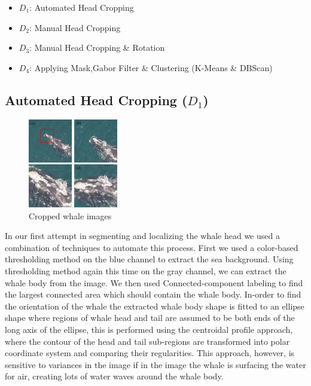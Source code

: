 \begin{itemize}
	\vspace{-0.6cm}
	\setlength{\itemsep}{0pt}
	\setlength{\parskip}{0pt}
	\setlength{\parsep}{0pt}
	
	\item{$D_{1}$: Automated Head Cropping}
	\item{$D_{2}$: Manual Head Cropping}
	\item{$D_{3}$: Manual Head Cropping \& Rotation}
	\item{$D_{4}$: Applying Mask,Gabor Filter \& Clustering (K-Means \& DBScan)}	
\end{itemize}

\subsection{Automated Head Cropping ($D_{1}$)}
\label{subsec:auto_head_cropping}
\begin{figure}
	\vspace{-0.4cm}
	\centering
	\includegraphics[width=0.35\textwidth]{sections/imgs/preprocessing/whale_image.jpg}
	\caption{Cropped whale images}
	\label{fig:preprocess_whaleimage}
\end{figure}
In our first attempt in segmenting and localizing the whale head we used a combination of techniques to automate this process. First we used a color-based thresholding method\cite{otsu1975threshold} on the blue channel to extract the sea background. Using thresholding method again this time on the gray channel, we can extract the whale body from the image. We then used Connected-component labeling\cite{haralock1991computer} to find the largest connected area which should contain the whale body. In-order to find the orientation of the whale the extracted whale body shape is fitted to an ellipse shape where regions of whale head and tail are assumed to be both ends of the long axis of the ellipse, this is performed using the centroidal profile approach\cite{davies2004machine}, where the contour of the head and tail sub-regions are transformed into polar coordinate system and comparing their regularities. This approach, however, is sensitive to variances in the image if in the image the whale is surfacing the water for air, creating lots of water waves around the whale body.

